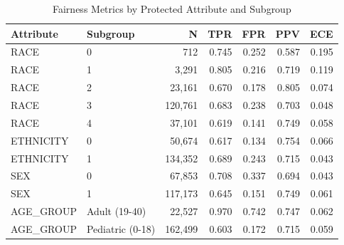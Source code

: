 
\begin{table}[htbp]
\centering
\caption{Fairness Metrics by Protected Attribute and Subgroup}
\label{tab:fairness_metrics}
\begin{tabular}{llrrrrr}
\toprule
Attribute & Subgroup & N & TPR & FPR & PPV & ECE \\
\midrule
RACE & 0 & 712 & 0.745 & 0.252 & 0.587 & 0.195 \\
RACE & 1 & 3,291 & 0.805 & 0.216 & 0.719 & 0.119 \\
RACE & 2 & 23,161 & 0.670 & 0.178 & 0.805 & 0.074 \\
RACE & 3 & 120,761 & 0.683 & 0.238 & 0.703 & 0.048 \\
RACE & 4 & 37,101 & 0.619 & 0.141 & 0.749 & 0.058 \\
ETHNICITY & 0 & 50,674 & 0.617 & 0.134 & 0.754 & 0.066 \\
ETHNICITY & 1 & 134,352 & 0.689 & 0.243 & 0.715 & 0.043 \\
SEX & 0 & 67,853 & 0.708 & 0.337 & 0.694 & 0.043 \\
SEX & 1 & 117,173 & 0.645 & 0.151 & 0.749 & 0.061 \\
AGE_GROUP & Adult (19-40) & 22,527 & 0.970 & 0.742 & 0.747 & 0.062 \\
AGE_GROUP & Pediatric (0-18) & 162,499 & 0.603 & 0.172 & 0.715 & 0.059 \\

\bottomrule
\end{tabular}
\end{table}
